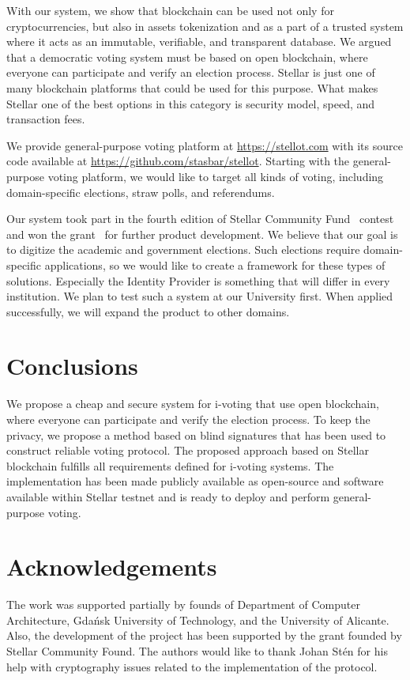 \documentclass[applsci,article,submit,moreauthors,pdftex]{Definitions/mdpi}
\begin{document}
With our system, we show that blockchain can be used not only for cryptocurrencies, but also in assets tokenization and as a part of a trusted system where it acts as an immutable, verifiable, and transparent database. We argued that a democratic voting system must be based on open blockchain, where everyone can participate and verify an election process. Stellar is just one of many blockchain platforms that could be used for this purpose. What makes Stellar one of the best options in this category is security model, speed, and transaction fees. 

We provide general-purpose voting platform at \url{https://stellot.com} with its source code available at \url{https://github.com/stasbar/stellot}.
Starting with the general-purpose voting platform, we would like to target all kinds of voting, including domain-specific elections, straw polls, and referendums.

Our system took part in the fourth edition of Stellar Community Fund~\cite{StellarC85:online} contest and won the grant~\cite{StellarC62:online} for further product development. We believe that our goal is to digitize the academic and government elections. Such elections require domain-specific applications, so we would like to create a framework for these types of solutions. Especially the Identity Provider is something that will differ in every institution. We plan to test such a system at our University first. When applied successfully, we will expand the product to other domains.

\section{Conclusions}
We propose a cheap and secure system for i-voting that use 
open blockchain, where everyone can participate and verify the election process.
To keep the privacy, we propose a method based on blind signatures 
that has been used to construct reliable voting protocol.
The proposed approach based on Stellar blockchain fulfills all requirements defined for i-voting systems.
The implementation has been made publicly available as open-source and software available within Stellar testnet and is ready to deploy and perform general-purpose voting.

\section*{Acknowledgements} 
The work was supported partially by founds of 
Department of Computer Architecture,  Gda\'nsk University of Technology, and the University of Alicante.
Also, the development of the project has been supported by the grant founded by Stellar Community Found.
The authors would like to thank Johan Stén for his help with cryptography issues related to the implementation of the protocol.


 
 
 
\end{document}
